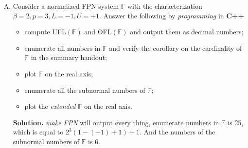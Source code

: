 \documentclass[a4paper]{book}
\newenvironment{solution}%
{\noindent\textbf{Solution.}}%
{\qedhere}
\numberwithin{equation}{chapter}
\theoremstyle{definition}
\begin{document}
\begin{enumerate}[(A)]
\item Consider a normalized FPN system $\mathbb{F}$ with the characterization $\beta = 2, p = 3, L = -1, U = +1$. Answer the following by \textit{programming} in \textbf{C++}
  \begin{itemize}
  \item compute UFL$(\mathbb{F})$ and OFL$(\mathbb{F})$ and output them as decimal numbers;

  \item enumerate all numbers in $\mathbb{F}$ and verify the corollary on the cardinality of $\mathbb{F}$ in the summary handout;

  \item plot $\mathbb{F}$ on the real axis;

  \item enumerate all the subnormal numbers of $\mathbb{F}$;

  \item plot the \textit{extended} $\mathbb{F}$ on the real axis.
    
  \end{itemize}

  \begin{solution}
    \textit{make FPN} will output every thing, enumerate numbers in $\mathbb{F}$ is 25, which is equal to $2^3(1 - (-1) + 1) + 1$. And the numbers of the subnormal numbers of $\mathbb{F}$ is 6.
  \end{solution}
\end{enumerate}

















%   

%   

%   


\end{document}
